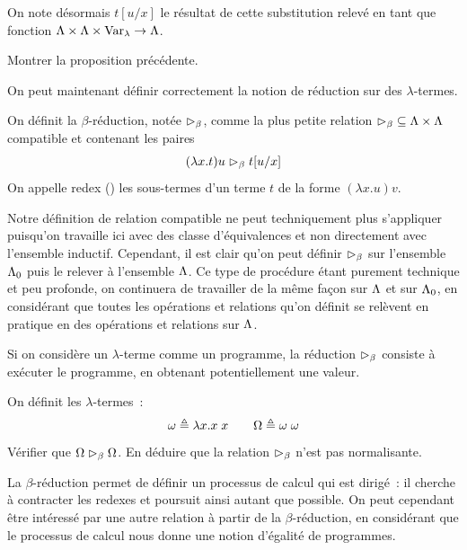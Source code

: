 \begin{notation}
  On note désormais $t[u/x]$ le résultat de cette substitution relevé en tant
  que fonction $\Lambda\times\Lambda\times\operatorname{Var}_{\lambda} \to \Lambda$.
\end{notation}

\begin{exercise}
  Montrer la proposition précédente.
\end{exercise}

On peut maintenant définir correctement la notion de réduction sur des
$\lambda$-termes.

\begin{definition}
  On définit la $\beta$-réduction, notée $\bred$, comme la plus petite relation
  $\mathord{\mathrel{\rhd_{\beta}}}\subseteq\Lambda\times\Lambda$ compatible et contenant les
  paires
  \[(\lambda x.t)u\mathrel{\rhd_{\beta}} t[u/x]\]
  On appelle redex () les sous-termes d'un
  terme $t$ de la forme $(\lambda x.u)v$.
  \index[notation]{$\bred$}
\end{definition}

\begin{remark}
  Notre définition de relation compatible ne peut techniquement plus s'appliquer
  puisqu'on travaille ici avec des classe d'équivalences et non directement
  avec l'ensemble inductif. Cependant, il est clair qu'on peut définir
  $\bred$ sur l'ensemble $\Lambda_0$ puis le relever à l'ensemble $\Lambda$.
  Ce type de procédure étant purement technique et peu profonde, on continuera
  de travailler de la même façon sur $\Lambda$ et sur $\Lambda_0$, en
  considérant que toutes les opérations et relations qu'on définit se relèvent
  en pratique en des opérations et relations sur $\Lambda$.
\end{remark}

Si on considère un $\lambda$-terme comme un programme, la réduction $\bred$
consiste à exécuter le programme, en obtenant potentiellement une valeur.

\begin{exercise}
  On définit les $\lambda$-termes~:
  \[\omega \triangleq \lambda x.x\;x \qquad \Omega\triangleq \omega\;\omega\]
  Vérifier que $\Omega\mathrel{\rhd_{\beta}} \Omega$. En déduire que la relation $\bred$ n'est
  pas normalisante.
\end{exercise}

La $\beta$-réduction permet de définir un processus de calcul qui est dirigé~:
il cherche à contracter les redexes et poursuit ainsi autant que possible. On
peut cependant être intéressé par une autre relation à partir de la
$\beta$-réduction, en considérant que le processus de calcul nous donne une
notion d'égalité de programmes.

